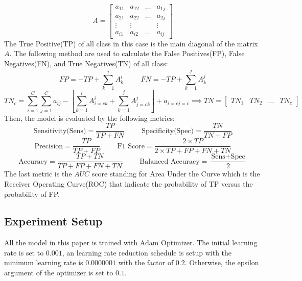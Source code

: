 \[
	A = \begin{bmatrix}
		a_{11} & a_{12} & \dots & a_{1j} \\
		a_{21} & a_{22} & \dots & a_{2j} \\
		\vdots & \vdots	&  & \vdots\\
		a_{i1} & a_{i2} & \dots & a_{ij} 
	\end{bmatrix}
\]
The True Positive(TP) of all class in this case is the main diagonal of the matrix $A$. The following method are used to calculate the False Positives(FP), False Negatives(FN), and True Negatives(TN) of all class:
\[
	FP = -TP + \sum_{k=1}^{i}A^i_k \hspace{1cm} FN = -TP + \sum_{k=1}^{j}A^j_k
\]
\[
	TN_c = \sum_{i=1}^{C}\sum_{j=1}^{C}a_{ij} - \left[ \sum_{k=1}^{i}A^i_{i=c k} + \sum_{k=1}^{j}A^j_{j=c k} \right] + a_{i=c j=c} \implies TN = \begin{bmatrix}
		TN_1 & TN_2 & \dots & TN_c
	\end{bmatrix}
\]
Then, the model is evaluated by the following metrics:
\[\text{Sensitivity(Sens)} = \frac{TP}{TP + FN} \hspace{1cm} \text{Specificity(Spec)} = \frac{TN}{TN + FP}\]
\[\text{Precision} = \frac{TP}{TP + FP} \hspace{1cm} \text{F1 Score} = \frac{2 \times TP}{2 \times TP + FP + FN + TN}\]
\[\text{Accuracy} = \frac{TP + TN}{TP + FP + FN + TN} \hspace{1cm} \text{Balanced Accuracy} = \frac{\text{Sens} + \text{Spec}}{2}\]
The last metric is the $AUC$ score standing for Area Under the Curve which is the Receiver Operating Curve(ROC) that indicate the probability of TP versus the probability of FP.  
\subsection{Experiment Setup}
All the model in this paper is trained with Adam Optimizer\cite{6980}. The initial learning rate is set to $0.001$, an learning rate reduction schedule is setup with the minimum learning rate is $0.0000001$ with the factor of $0.2$. Otherwise, the epsilon argument of the optimizer is set to $0.1$. 
